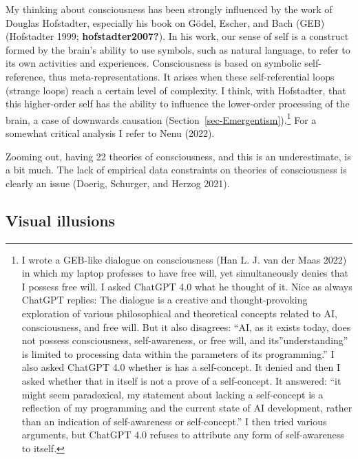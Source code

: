 \documentclass[
  a4paper,
  DIV=11,
  numbers=noendperiod,
  oneside]{scrreprt}
\begin{document}
My thinking about consciousness has been strongly influenced by the work
of Douglas Hofstadter, especially his book on Gödel, Escher, and Bach
(GEB) (Hofstadter 1999; \textbf{hofstadter2007?}). In his work, our
sense of self is a construct formed by the brain's ability to use
symbols, such as natural language, to refer to its own activities and
experiences. Consciousness is based on symbolic self-reference, thus
meta-representations. It arises when these self-referential loops
(strange loops) reach a certain level of complexity. I think, with
Hofstadter, that this higher-order self has the ability to influence the
lower-order processing of the brain, a case of downwards causation
(Section~\ref{sec-Emergentism}).\footnote{I wrote a GEB-like dialogue on
  consciousness (Han L. J. van der Maas 2022) in which my laptop
  professes to have free will, yet simultaneously denies that I possess
  free will. I asked ChatGPT 4.0 what he thought of it. Nice as always
  ChatGPT replies: The dialogue is a creative and thought-provoking
  exploration of various philosophical and theoretical concepts related
  to AI, consciousness, and free will. But it also disagrees: ``AI, as
  it exists today, does not possess consciousness, self-awareness, or
  free will, and its''understanding'' is limited to processing data
  within the parameters of its programming.'' I also asked ChatGPT 4.0
  whether is has a self-concept. It denied and then I asked whether that
  in itself is not a prove of a self-concept. It answered: ``it might
  seem paradoxical, my statement about lacking a self-concept is a
  reflection of my programming and the current state of AI development,
  rather than an indication of self-awareness or self-concept.'' I then
  tried various arguments, but ChatGPT 4.0 refuses to attribute any form
  of self-awareness to itself.} For a somewhat critical analysis I refer
to Nenu (2022).

Zooming out, having 22 theories of consciousness, and this is an
underestimate, is a bit much. The lack of empirical data constraints on
theories of consciousness is clearly an issue (Doerig, Schurger, and
Herzog 2021).

\hypertarget{sec-Visual-illusions}{%
\subsection{Visual illusions}\label{sec-Visual-illusions}}
\end{document}

